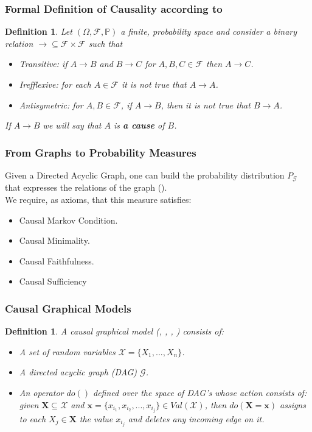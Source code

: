 \documentclass{beamer}
\theoremstyle{plain}
\newtheorem{defi}[teo]{Definition}
\begin{document}
		\begin{frame}
		\frametitle{Formal Definition of Causality according to \cite{spirtes2000causation}}
		\begin{defi}
		Let $(\Omega, \mathcal{F}, \mathbb{P})$ a finite, probability space and consider a binary relation  $\to  \subseteq \mathcal{F} \times \mathcal{F}$ such that
		\begin{itemize}
		\item Transitive: if $A \to B$ and $B \to C$ for $A,B,C \in \mathcal{F}$ then $A \to C$.
		\item  Irefflexive: for each $A \in \mathcal{F}$ it is not true that $A \to A$.
		\item Antisymetric: for $A, B \in \mathcal{F}$, if $A \to B$, then it is not true that $B \to A$.
		\end{itemize}
		If $A \to B$ we will say that $A$ is \textbf{a cause} of $B$.
		\end{defi}
		\end{frame}
		
		\begin{frame}
		\frametitle{From Graphs to Probability Measures}
		Given a Directed Acyclic Graph, one can build the probability distribution $P_\mathcal{G}$ that expresses the relations of the graph (\cite{koller2009probabilistic}). \\
		We require, as axioms, that this measure satisfies:
        \begin{itemize}
        \item Causal Markov Condition.
        \item Causal Minimality.
         \item Causal Faithfulness.
         \item Causal Sufficiency
        \end{itemize}
		\end{frame}
		
	\begin{frame}
	\frametitle{Causal Graphical Models}
	\begin{defi}
	A causal graphical model (\cite{spirtes2000causation}, \cite{pearl2009causality}, \cite{koller2003multi}, \cite{sucar2015probabilistic}) consists of:
	\begin{itemize}
	 \item A set of random variables $\mathcal{X}=\{ X_1,...,X_n \}$.
	 \item A directed acyclic graph (DAG) $\mathcal{G}$.
	 \item An operator $do()$ defined over the space of DAG's whose action consists of: given $\mathbf{X} \subseteq \mathcal{X}$ and $\mathbf{x} = \{ x_{i_1}, x_{i_2}, ... , x_{i_j} \} \in Val(\mathcal{X})$, then $do(\mathbf{X} = \mathbf{x} )$ assigns to each $X_j \in \mathbf{X}$ the value $x_{i_j}$ and deletes any incoming edge on it.
	 \end{itemize}
	 \end{defi}
	 \end{frame}
\end{document}

